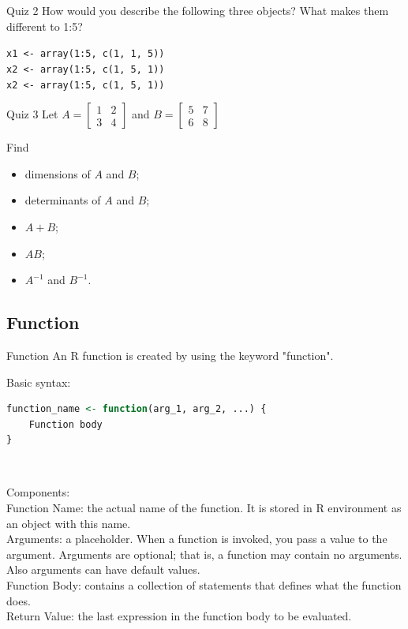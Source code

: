 \documentclass{beamer}
\begin{document}
\begin{frame}{Quiz 2}
How would you describe the following three objects? What makes them different to 1:5?\\
\hfill

\texttt{x1 <- array(1:5, c(1, 1, 5))}\\
\texttt{x2 <- array(1:5, c(1, 5, 1))}\\
\texttt{x2 <- array(1:5, c(1, 5, 1))}
\end{frame}

\begin{frame}{Quiz 3}
Let $A = \begin{bmatrix}
    1 & 2 \\
    3 & 4
  \end{bmatrix}$
and $B = \begin{bmatrix}
    5 & 7 \\
    6 & 8
  \end{bmatrix}$\\
\hfill

Find\\
\begin{itemize}
    \item dimensions of $A$ and $B$;
    \item determinants of $A$ and $B$;
    \item $A+B$;
    \item $AB$;
    \item $A^{-1}$ and $B^{-1}$.
\end{itemize}

\end{frame}

\subsection{Function}

\begin{frame}[fragile]{Function}
An R function is created by using the keyword "function".\\
\hfill

Basic syntax:
\begin{lstlisting}[language=R]
function_name <- function(arg_1, arg_2, ...) {
    Function body
}
\end{lstlisting}\\
\hfill

Components:\\
Function Name: the actual name of the function. It is stored in R environment as an object with this name.\\
Arguments: a placeholder. When a function is invoked, you pass a value to the argument. Arguments are optional; that is, a function may contain no arguments. Also arguments can have default values.\\
Function Body: contains a collection of statements that defines what the function does.\\
Return Value: the last expression in the function body to be evaluated.

\end{frame}
\end{document}
